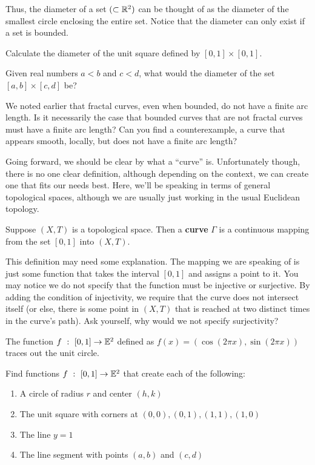 Thus, the diameter of a set $(\subset \mathbb{R}^2)$ can be thought of as the diameter of the smallest circle enclosing the entire set. Notice that the diameter can only exist if a set is bounded. 
\begin{exercise}
    Calculate the diameter of the unit square defined by $[0,1]\times[0,1]$.
\end{exercise}
\begin{exercise}
    Given real numbers $a<b$ and $c<d$, what would the diameter of the set $[a,b]\times [c,d]$ be?
\end{exercise}
\begin{exercise} 
    We noted earlier that fractal curves, even when bounded, do not have a finite arc length. Is it necessarily the case that bounded curves that are not fractal curves must have a finite arc length? Can you find a counterexample, a curve that appears smooth, locally, but does not have a finite arc length? 
\end{exercise}

Going forward, we should be clear by what a ``curve'' is. Unfortunately though, there is no one clear definition, although depending on the context, we can create one that fits our needs best. Here, we'll be speaking in terms of general topological spaces, although we are usually just working in the usual Euclidean topology. \par

\begin{definition}[Curve]
    Suppose $(X,T)$ is a topological space. Then a \textbf{curve} $\Gamma$ is a continuous mapping from the set $[0,1]$ into $(X,T)$.
\end{definition}

This definition may need some explanation. The mapping we are speaking of is just some function that takes the interval $[0,1]$ and assigns a point to it. You may notice we do not specify that the function must be injective or surjective. By adding the condition of injectivity, we require that the curve does not intersect itself (or else, there is some point in $(X,T)$ that is reached at two distinct times in the curve's path). Ask yourself, why would we not specify surjectivity?\par

The function $f\ :\ [0,1]\to\mathbb{E}^2$ defined as $f(x)=\left(\cos(2\pi x),\sin(2\pi x)\right)$ traces out the unit circle.\par

\begin{exercise}
    Find functions $f\ :\ [0,1]\to\mathbb{E}^2$ that create each of the following:
    \begin{enumerate}
        \item A circle of radius $r$ and center $(h,k)$
        \item The unit square with corners at $(0,0),(0,1),(1,1),(1,0)$
        \item The line $y=1$
        \item The line segment with points $(a,b)$ and $(c,d)$
    \end{enumerate}
\end{exercise}

